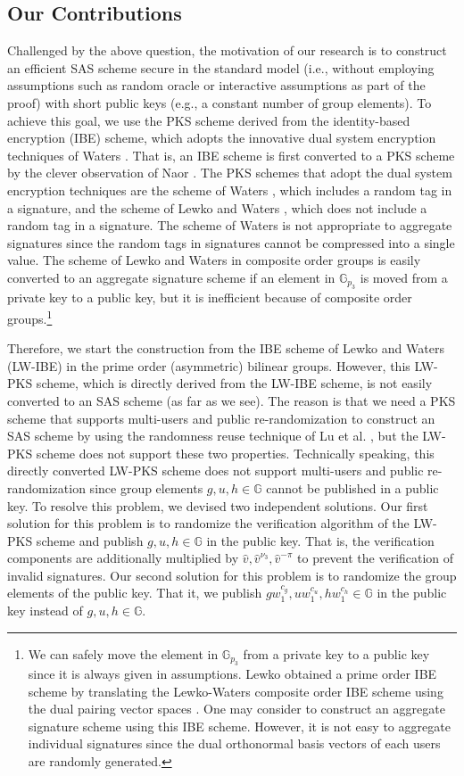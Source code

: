 \documentclass[11pt,letterpaper]{article}
\newcommand{\G}{\mathbb{G}}
\begin{document}
\subsection{Our Contributions}

Challenged by the above question, the motivation of our research is to
construct an efficient SAS scheme secure in the standard model (i.e., without
employing assumptions such as random oracle or interactive assumptions as
part of the proof) with short public keys (e.g., a constant number of group
elements). To achieve this goal, we use the PKS scheme derived from the
identity-based encryption (IBE) scheme, which adopts the innovative dual
system encryption techniques of Waters \cite{Waters09,LewkoW10}. That is, an
IBE scheme is first converted to a PKS scheme by the clever observation of
Naor \cite{BonehF01}. The PKS schemes that adopt the dual system encryption
techniques are the scheme of Waters \cite{Waters09}, which includes a random
tag in a signature, and the scheme of Lewko and Waters \cite{LewkoW10}, which
does not include a random tag in a signature. The scheme of Waters is not
appropriate to aggregate signatures since the random tags in signatures
cannot be compressed into a single value. The scheme of Lewko and Waters in
composite order groups is easily converted to an aggregate signature scheme
if an element in $\G_{p_3}$ is moved from a private key to a public key, but
it is inefficient because of composite order groups.\footnote{We can safely
move the element in $\G_{p_3}$ from a private key to a public key since it is
always given in assumptions. Lewko obtained a prime order IBE scheme by
translating the Lewko-Waters composite order IBE scheme using the dual
pairing vector spaces \cite{Lewko12}. One may consider to construct an
aggregate signature scheme using this IBE scheme. However, it is not easy to
aggregate individual signatures since the dual orthonormal basis vectors of
each users are randomly generated.}

Therefore, we start the construction from the IBE scheme of Lewko and Waters
(LW-IBE) \cite{LewkoW10} in the prime order (asymmetric) bilinear groups.
However, this LW-PKS scheme, which is directly derived from the LW-IBE
scheme, is not easily converted to an SAS scheme (as far as we see). The
reason is that we need a PKS scheme that supports multi-users and public
re-randomization to construct an SAS scheme by using the randomness reuse
technique of Lu et al. \cite{LuOSSW06}, but the LW-PKS scheme does not
support these two properties. Technically speaking, this directly converted
LW-PKS scheme does not support multi-users and public re-randomization since
group elements $g, u, h \in \G$ cannot be published in a public key. To
resolve this problem, we devised two independent solutions. Our first
solution for this problem is to randomize the verification algorithm of the
LW-PKS scheme and publish $g, u, h \in \G$ in the public key. That is, the
verification components are additionally multiplied by $\hat{v},
\hat{v}^{\nu_3}, \hat{v}^{-\pi}$ to prevent the verification of invalid
signatures. Our second solution for this problem is to randomize the group
elements of the public key. That it, we publish $g w_1^{c_g}, u w_1^{c_u}, h
w_1^{c_h} \in \G$ in the public key instead of $g, u, h \in \G$.
\end{document}
